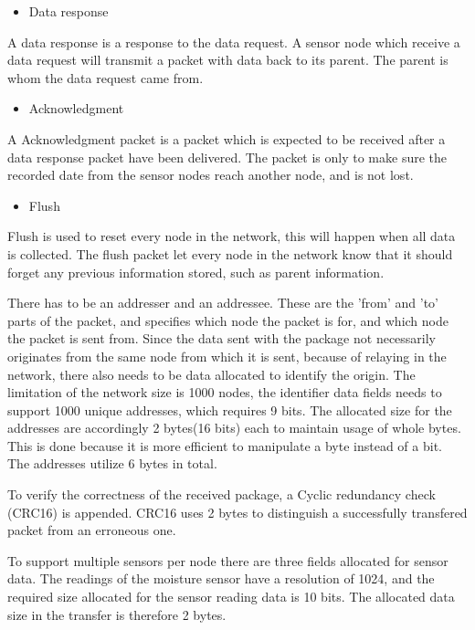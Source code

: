 \begin{itemize}
\item Data response
\end{itemize}
A data response is a response to the data request.
A sensor node which receive a data request will transmit a packet with data back to its parent.
The parent is whom the data request came from.

\begin{itemize}
\item Acknowledgment
\end{itemize}
A Acknowledgment packet is a packet which is expected to be received after a data response packet have been delivered.
The packet is only to make sure the recorded date from the sensor nodes reach another node, and is not lost.

\begin{itemize}
\item Flush
\end{itemize}
Flush is used to reset every node in the network, this will happen when all data is collected.
The flush packet let every node in the network know that it should forget any previous information stored, such as parent information.

There has to be an addresser and an addressee. These are the 'from' and 'to' parts of the packet, and specifies which node the packet is for, and which node the packet is sent from.
Since the data sent with the package not necessarily originates from the same node from which it is sent, because of relaying in the network, there also needs to be data allocated to identify the origin.
The limitation of the network size is 1000 nodes, the identifier data fields needs to support 1000 unique addresses, which requires 9 bits. The allocated size for the addresses are accordingly 2 bytes(16 bits) each to maintain usage of whole bytes. This is done because it is more efficient to manipulate a byte instead of a bit.\cite{bytevsbit} The addresses utilize 6 bytes in total.

To verify the correctness of the received package, a Cyclic redundancy check (CRC16) is appended. CRC16 uses 2 bytes to distinguish a successfully transfered packet from an erroneous one. 

To support multiple sensors per node there are three fields allocated for sensor data.
The readings of the moisture sensor have a resolution of 1024, and the required size allocated for the sensor reading data is 10 bits. The allocated data size in the transfer is therefore 2 bytes.

